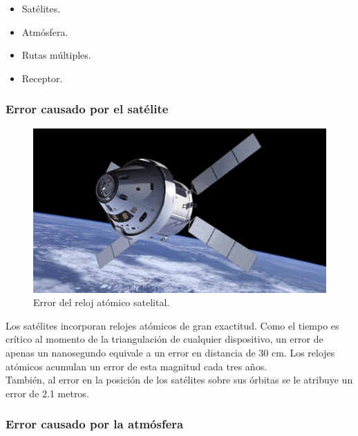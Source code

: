 \begin{itemize}
	\item Satélites.
	\item Atmósfera.
	\item Rutas múltiples.
	\item Receptor.
\end{itemize} 

\subsubsection{Error causado por el satélite}

\begin{figure}[H]
\centering
\includegraphics[scale=0.41]{Figures/Sat}
\caption[Error del reloj atómico satelital.]{Error del reloj atómico satelital\footnotemark.}
\label{fig:ErrSat}
\end{figure}


Los satélites incorporan relojes atómicos de gran exactitud. Como el tiempo es crítico al momento de la triangulación de cualquier dispositivo, un error de apenas un nanosegundo equivale a un error en distancia de 30 cm. Los relojes atómicos acumulan un error de esta magnitud cada tres años. \\

También, al error en la posición de los satélites sobre sus órbitas se le atribuye un error de 2.1 metros.

\subsubsection{Error causado por la atmósfera}

